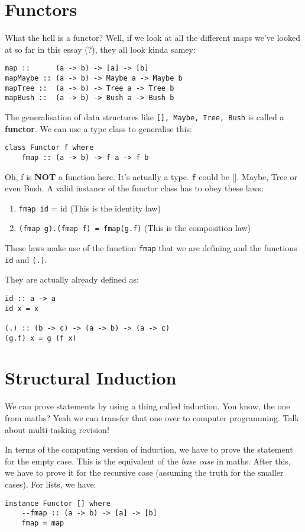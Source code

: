 \documentclass[11pt,a4paper,titlepage]{scrartcl}
\begin{document}
\section{Functors}%
\label{sec:Functors}
What the hell is a functor? Well, if we look at all the different maps
we've looked at so far in this essay (?), they all look kinda samey:
\begin{lstlisting}
map ::      (a -> b) -> [a] -> [b]
mapMaybe :: (a -> b) -> Maybe a -> Maybe b
mapTree ::  (a -> b) -> Tree a -> Tree b
mapBush ::  (a -> b) -> Bush a -> Bush b
\end{lstlisting}

The generalisation of data structures like \lstinline|[], Maybe, Tree, Bush|
is called a \textbf{functor}. We can use a type class to generalise this:

\begin{lstlisting}
class Functor f where
    fmap :: (a -> b) -> f a -> f b
\end{lstlisting}

Oh, f is \textbf{NOT} a function here. It's actually a type. \lstinline|f|
could be []. Maybe, Tree or even Bush. A valid instance of the functor
class has to obey these laws:
\begin{enumerate}
    \item \lstinline|fmap id| = id (This is the identity law)
    \item \lstinline|(fmap g).(fmap f) = fmap(g.f)| (This is the
        composition law)
\end{enumerate}

These laws make use of the function \lstinline|fmap| that we are defining
and the functions \lstinline|id| and \lstinline|(.)|.

They are actually already defined as:
\begin{lstlisting}
id :: a -> a
id x = x

(.) :: (b -> c) -> (a -> b) -> (a -> c)
(g.f) x = g (f x)
\end{lstlisting}

\section{Structural Induction}%
\label{sec:induction}
We can prove statements by using a thing called induction. You know, the
one from maths? Yeah we can transfer that one over to computer
programming. Talk about multi-tasking revision!

In terms of the computing version of induction, we have to prove the
statement for the empty case. This is the equivalent of the \textit{base
case} in maths. After this, we have to prove it for the recursive case
(assuming the truth for the smaller cases). For lists, we have:
\begin{lstlisting}
instance Functor [] where
    --fmap :: (a -> b) -> [a] -> [b]
    fmap = map
\end{lstlisting}
\end{document}
